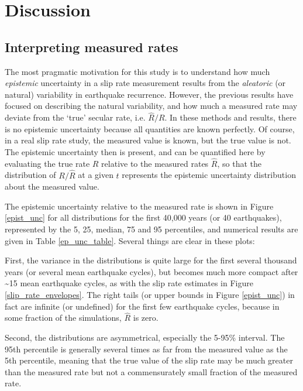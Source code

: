 \documentclass[se, manuscript]{copernicus}
\begin{document}
\section{Discussion}\label{discussion}

\subsection{Interpreting measured
rates}\label{interpreting-measured-rates}

The most pragmatic motivation for this study is to understand how much
\emph{epistemic} uncertainty in a slip rate measurement results from the
\emph{aleatoric} (or natural) variability in earthquake
recurrence. However, the previous results have focused on describing the
natural variability, and how much a measured rate may deviate from the
`true' secular rate, i.e. \(\hat{R}/R\). In these methods and results,
there is no epistemic uncertainty because all quantities are known
perfectly. Of course, in a real slip rate study, the measured value is
known, but the true value is not. The epistemic uncertainty then is
present, and can be quantified here by evaluating the true rate \(R\)
relative to the measured rates \(\hat{R}\), so that the distribution of
\(R / \hat{R}\) at a given \(t\) represents the epistemic uncertainty
distribution about the measured value.

The epistemic uncertainty relative to the measured rate is shown in
Figure \ref{epist_unc} for all distributions for the first 40,000 years
(or 40 earthquakes), represented by the 5, 25, median, 75 and 95
percentiles, and numerical results are given in Table
\ref{ep_unc_table}. Several things are clear in these plots:

First, the variance in the distributions is quite large for the first
several thousand years (or several mean earthquake cycles), but becomes
much more compact after \textasciitilde{}15 mean earthquake cycles, as
with the slip rate estimates in Figure \ref{slip_rate_envelopes}. The
right tails (or upper bounds in Figure \ref{epist_unc}) in fact are
infinite (or undefined) for the first few earthquake cycles, because in
some fraction of the simulations, \(\hat{R}\) is zero.

Second, the distributions are asymmetrical, especially the 5-95\%
interval. The 95th percentile is generally several times as far from the
measured value as the 5th percentile, meaning that the true value of the
slip rate may be much greater than the measured rate but not a
commensurately small fraction of the measured rate.
\end{document}

